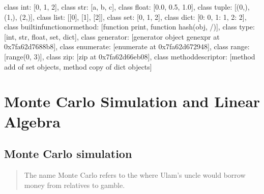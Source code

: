 \documentclass[letterpaper,10pt,english]{sphinxmanual}
\begin{document}
\begin{sphinxVerbatim}[commandchars=\\\{\}]
\PYGZob{}\PYGZdq{}\PYGZlt{}class \PYGZsq{}int\PYGZsq{}\PYGZgt{}\PYGZdq{}: [0, 1, 2],
 \PYGZdq{}\PYGZlt{}class \PYGZsq{}str\PYGZsq{}\PYGZgt{}\PYGZdq{}: [\PYGZsq{}a\PYGZsq{}, \PYGZsq{}b\PYGZsq{}, \PYGZsq{}c\PYGZsq{}],
 \PYGZdq{}\PYGZlt{}class \PYGZsq{}float\PYGZsq{}\PYGZgt{}\PYGZdq{}: [0.0, 0.5, 1.0],
 \PYGZdq{}\PYGZlt{}class \PYGZsq{}tuple\PYGZsq{}\PYGZgt{}\PYGZdq{}: [(0,), (1,), (2,)],
 \PYGZdq{}\PYGZlt{}class \PYGZsq{}list\PYGZsq{}\PYGZgt{}\PYGZdq{}: [[0], [1], [2]],
 \PYGZdq{}\PYGZlt{}class \PYGZsq{}set\PYGZsq{}\PYGZgt{}\PYGZdq{}: [\PYGZob{}0\PYGZcb{}, \PYGZob{}1\PYGZcb{}, \PYGZob{}2\PYGZcb{}],
 \PYGZdq{}\PYGZlt{}class \PYGZsq{}dict\PYGZsq{}\PYGZgt{}\PYGZdq{}: [\PYGZob{}0: 0\PYGZcb{}, \PYGZob{}1: 1\PYGZcb{}, \PYGZob{}2: 2\PYGZcb{}],
 \PYGZdq{}\PYGZlt{}class \PYGZsq{}builtin\PYGZus{}function\PYGZus{}or\PYGZus{}method\PYGZsq{}\PYGZgt{}\PYGZdq{}: [\PYGZlt{}function print\PYGZgt{},
  \PYGZlt{}function hash(obj, /)\PYGZgt{}],
 \PYGZdq{}\PYGZlt{}class \PYGZsq{}type\PYGZsq{}\PYGZgt{}\PYGZdq{}: [int, str, float, set, dict],
 \PYGZdq{}\PYGZlt{}class \PYGZsq{}generator\PYGZsq{}\PYGZgt{}\PYGZdq{}: [\PYGZlt{}generator object \PYGZlt{}genexpr\PYGZgt{} at 0x7fa62d7688b8\PYGZgt{}],
 \PYGZdq{}\PYGZlt{}class \PYGZsq{}enumerate\PYGZsq{}\PYGZgt{}\PYGZdq{}: [\PYGZlt{}enumerate at 0x7fa62d672948\PYGZgt{}],
 \PYGZdq{}\PYGZlt{}class \PYGZsq{}range\PYGZsq{}\PYGZgt{}\PYGZdq{}: [range(0, 3)],
 \PYGZdq{}\PYGZlt{}class \PYGZsq{}zip\PYGZsq{}\PYGZgt{}\PYGZdq{}: [\PYGZlt{}zip at 0x7fa62d66eb08\PYGZgt{}],
 \PYGZdq{}\PYGZlt{}class \PYGZsq{}method\PYGZus{}descriptor\PYGZsq{}\PYGZgt{}\PYGZdq{}: [\PYGZlt{}method \PYGZsq{}add\PYGZsq{} of \PYGZsq{}set\PYGZsq{} objects\PYGZgt{},
  \PYGZlt{}method \PYGZsq{}copy\PYGZsq{} of \PYGZsq{}dict\PYGZsq{} objects\PYGZgt{}]\PYGZcb{}
\end{sphinxVerbatim}


\chapter{Monte Carlo Simulation and Linear Algebra}
\label{\detokenize{Lecture9/Monte Carlo Simulation and Linear Algebra:monte-carlo-simulation-and-linear-algebra}}\label{\detokenize{Lecture9/Monte Carlo Simulation and Linear Algebra::doc}}

\section{Monte Carlo simulation}
\label{\detokenize{Lecture9/Monte Carlo Simulation and Linear Algebra:monte-carlo-simulation}}
\begin{quote}

The name Monte Carlo refers to the  where Ulam’s uncle would borrow money from relatives to gamble.
\end{quote}
\end{document}
